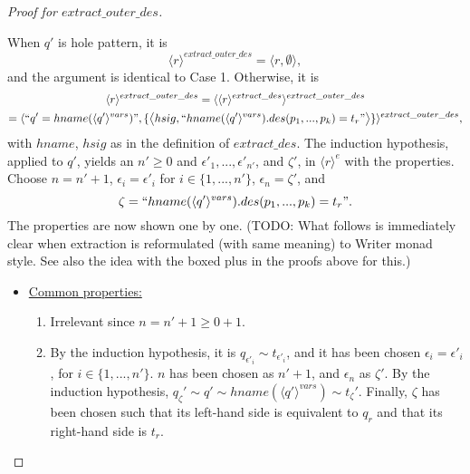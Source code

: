 \documentclass[11pt]{article} %
\begin{document}
\begin{proof}[Proof for $extract\_outer\_des$]
\begin{itemize}
When $q'$ is hole pattern, it is
\begin{equation*}
\langle r \rangle^{extract\_outer\_des} = \big\langle r, \emptyset \big\rangle,
\end{equation*}
and the argument is identical to Case 1. Otherwise, it is
\begin{multline*}
\langle r \rangle^{extract\_outer\_des} = \langle \langle r \rangle^{extract\_des} \rangle^{extract\_outer\_des}\\
= \langle `` q' = hname(\langle q' \rangle^{vars}) ", \{\big\langle hsig, `` hname(\langle q' \rangle^{vars}).des(p_1, ..., p_k) = t_r " \big\rangle \} \rangle^{extract\_outer\_des},
\end{multline*}
with $hname$, $hsig$ as in the definition of $extract\_des$. The induction hypothesis, applied to $q'$, yields an $n' \geq 0$ and $\epsilon'_1, ..., \epsilon'_{n'}$, and $\zeta'$, in $\langle r \rangle^e$ with the properties. Choose $n = n' + 1$, $\epsilon_i = \epsilon'_i$ for $i \in \{1, ..., n'\}$, $\epsilon_n = \zeta'$, and
\begin{equation*}
\zeta = `` hname(\langle q' \rangle^{vars}).des(p_1, ..., p_k) = t_r ".
\end{equation*} The properties are now shown one by one. (TODO: What follows is immediately clear when extraction is reformulated (with same meaning) to Writer monad style. See also the idea with the boxed plus in the proofs above for this.)
\begin{itemize}
\item \underline{Common properties:}
\begin{enumerate}
\item Irrelevant since $n = n' + 1 \geq 0 + 1$.
\item By the induction hypothesis, it is $q_{\epsilon'_i} \sim t_{\epsilon'_i}$, and it has been chosen $\epsilon_i = \epsilon'_i$, for $i \in \{1, ..., n'\}$. $n$ has been chosen as $n' + 1$, and $\epsilon_n$ as $\zeta'$. By the induction hypothesis, $q_\zeta' \sim q' \sim hname(\langle q' \rangle^{vars}) \sim t_\zeta'$. Finally, $\zeta$ has been chosen such that its left-hand side is equivalent to $q_r$ and that its right-hand side is $t_r$.
\end{enumerate}


\end{itemize}
\end{itemize}
\end{proof}
\end{document}
